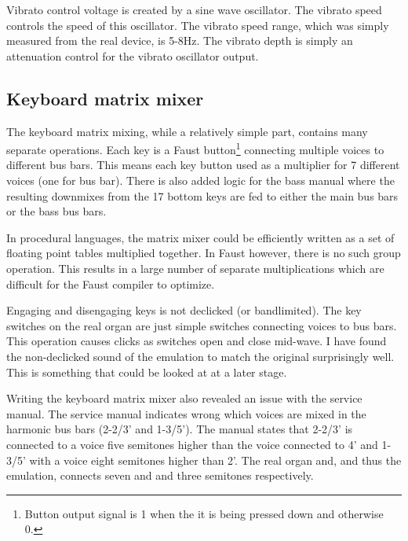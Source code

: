 \documentclass[11pt,a4paper]{article}
\begin{document}
Vibrato control voltage is created by a sine wave oscillator. The vibrato speed controls the speed of this oscillator. The vibrato speed range, which was simply measured from the real device, is 5-8Hz. The vibrato depth is simply an attenuation control for the vibrato oscillator output.




\subsection{Keyboard matrix mixer}

The keyboard matrix mixing, while a relatively simple part, contains many separate operations. Each key is a Faust button\footnote{Button output signal is 1 when the it is being pressed down and otherwise 0.} connecting multiple voices to different bus bars. This means each key button used as a multiplier for 7 different voices (one for bus bar). There is also added logic for the bass manual where the resulting downmixes from the 17 bottom keys are fed to either the main bus bars or the bass bus bars.

In procedural languages, the matrix mixer could be efficiently written as a set of floating point tables multiplied together. In Faust however, there is no such group operation. This results in a large number of separate multiplications which are difficult for the Faust compiler to optimize.

Engaging and disengaging keys is not declicked (or bandlimited). The key switches on the real organ are just simple switches connecting voices to bus bars. This operation causes clicks as switches open and close mid-wave. I have found the non-declicked sound of the emulation to match the original surprisingly well. This is something that could be looked at at a later stage.

Writing the keyboard matrix mixer also revealed an issue with the service manual. The service manual indicates wrong which voices are mixed in the harmonic bus bars (2-2/3' and 1-3/5'). The manual states that 2-2/3' is connected to a voice five semitones higher than the voice connected to 4' and 1-3/5' with a voice eight semitones higher than 2'. The real organ and, and thus the emulation, connects seven and and three semitones respectively.
\end{document}
